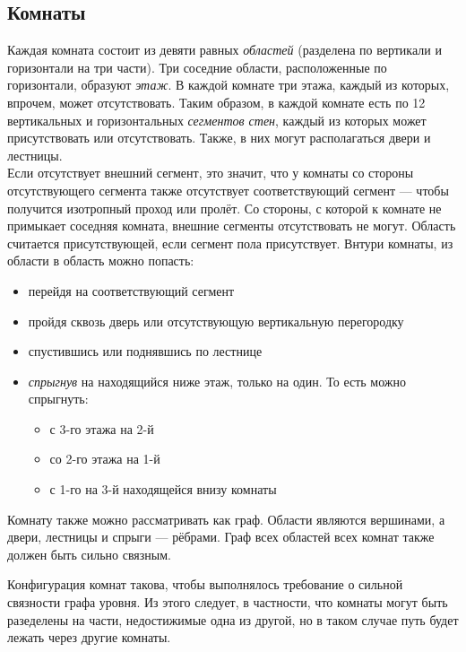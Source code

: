 \documentclass[12pt,a4paper]{article}
\begin{document}
\subsection{Комнаты}
Каждая комната состоит из девяти равных \textit{областей} (разделена по вертикали и горизонтали на три части). Три соседние области, расположенные по горизонтали, образуют \textit{этаж}. В каждой комнате три этажа, каждый из которых, впрочем, может отсутствовать.
Таким образом, в каждой комнате есть по 12 вертикальных и горизонтальных \textit{сегментов стен}, каждый из которых может присутствовать или отсутствовать. Также, в них могут располагаться двери и лестницы.\\
Если отсутствует внешний сегмент, это значит, что у комнаты со стороны отсутствующего сегмента также отсутствует соответствующий сегмент --- чтобы получится изотропный проход или пролёт. Со стороны, с которой к комнате не примыкает соседняя комната, внешние сегменты отсутствовать не могут.
Область считается присутствующей, если сегмент пола присутствует.
Внтури комнаты, из области в область можно попасть:
\begin{itemize}
\item перейдя на соответствующий сегмент
\item пройдя сквозь дверь или отсутствующую вертикальную перегородку
\item спустившись или поднявшись по лестнице
\item \textit{спрыгнув} на находящийся ниже этаж, только на один. То есть можно спрыгнуть:
  \begin{itemize}
  \item с 3-го этажа на 2-й
  \item со 2-го этажа на 1-й
  \item с 1-го на 3-й находящейся внизу комнаты
  \end{itemize}
\end{itemize}

Комнату также можно рассматривать как граф. Области являются вершинами, а двери, лестницы и спрыги --- рёбрами. Граф всех областей всех комнат также должен быть сильно связным.\\
\noindent {}
\noindent {}
\noindent {}

Конфигурация комнат такова, чтобы выполнялось требование о сильной связности графа уровня. Из этого следует, в частности, что комнаты могут быть разеделены на части, недостижимые одна из другой, но в таком случае путь будет лежать через другие комнаты.
\end{document}

